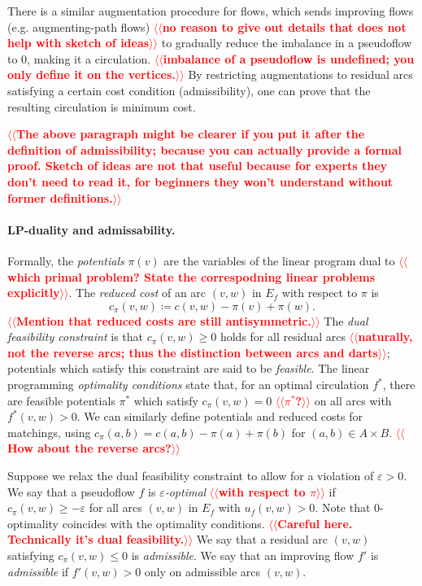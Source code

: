 \documentclass[11pt]{article}
\makeatletter
\def\eps{\varepsilon}
\theoremstyle{plain}
\numberwithin{figure}{section}
\def\n@te#1{\textsf{\boldmath \textbf{$\langle\!\langle$#1$\rangle\!\rangle$}}\leavevmode}
\def\note#1{\textcolor{red}{\n@te{#1}}}
\makeatother
\begin{document}
There is a similar augmentation procedure for flows, which sends improving
flows (e.g. augmenting-path flows) \note{no reason to give out details that does not help with sketch of ideas} to gradually reduce the imbalance in a
pseudoflow to 0, making it a circulation. \note{imbalance of a pseudoflow is undefined; you only define it on the vertices.}
By restricting augmentations to residual arcs satisfying a certain cost
condition (admissibility), one can prove that the resulting circulation is
minimum cost.

\note{The above paragraph might be clearer if you put it after the definition of admissibility; because you can actually provide a formal proof.  Sketch of ideas are not that useful because for experts they don't need to read it, for beginners they won't understand without former definitions.}

\paragraph{LP-duality and admissability.}
Formally, the
\emph{potentials} $\pi(v)$ are the variables of the linear program dual to \note{which primal problem? State the correspodning linear problems explicitly}.
The \emph{reduced cost} of an arc $(v, w)$ in $E_f$ with respect to $\pi$ is
\[
c_\pi(v, w) \coloneqq c(v, w) - \pi(v) + \pi(w).
\]
\note{Mention that reduced costs are still antisymmetric.}
The \emph{dual feasibility constraint} is that $c_\pi(v, w) \geq 0$ holds for all
residual arcs \note{naturally, not the reverse arcs; thus the distinction between arcs and darts}; potentials which satisfy this constraint are said to be \emph{feasible}.
The linear programming \emph{optimality conditions} state that, for an optimal
circulation $f^*$, there are feasible potentials $\pi^*$ which satisfy
$c_\pi(v, w) = 0$ \note{$\pi^*$?} on all arcs with $f^*(v, w) > 0$.
We can similarly define potentials and reduced costs for matchings, using
$c_\pi(a, b) = c(a, b) - \pi(a) + \pi(b)$ for $(a, b) \in A \times B$. \note{How about the reverse arcs?}

Suppose we relax the dual feasibility constraint to allow for a violation of
$\eps > 0$.
We say that a pseudoflow $f$ is \emph{$\eps$-optimal} \note{with respect to $\pi$} if
$c_\pi(v, w) \geq -\eps$ for all arcs $(v, w)$ in $E_f$ with $u_f(v, w) > 0$.
Note that 0-optimality coincides with the optimality conditions. \note{Careful here.  Technically it's dual feasibility.}
We say that a residual arc $(v ,w)$ satisfying $c_\pi(v, w) \leq 0$ is \emph{admissible}.
We say that an improving flow $f'$ is \emph{admissible} if $f'(v, w) > 0$
only on admissible arcs $(v, w)$.
\end{document}
